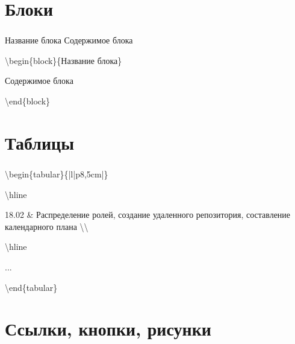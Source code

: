 \documentclass[russian, 14pt]{beamer}
\newcommand{\cm}[1]{{\color{Mycolor3}\textbackslash#1}}
\begin{document}
\section{Блоки}

\begin{frame}
	\frametitle{\insertsection}
	\begin{block}{Название блока}
		Содержимое блока
	\end{block}

	\begin{block}{}
		\cm{begin}\{block\}\{Название блока\}
		
		
		Содержимое блока
		
		
		\cm{end}\{block\}
	\end{block}

\end{frame}

\section{Таблицы}

\begin{frame} \label{button}
	\frametitle{\insertsection}
	\begin{block}{}
		\begin{flushleft}
			\cm{begin}\{tabular\}\{|l|p{8,5cm}|\}
			
			
			\cm{hline}
			
			
			18.02 \& Распределение ролей, создание удаленного репозитория, составление календарного плана \textbackslash\textbackslash
			
			
			\cm{hline}
			
			
			...
			
			
			\cm{end}\{tabular\}
			
			
			\hyperlink{tab}{}
		\end{flushleft}
	\end{block}
	
\end{frame}

\section{Ссылки, кнопки, рисунки}
\end{document}
